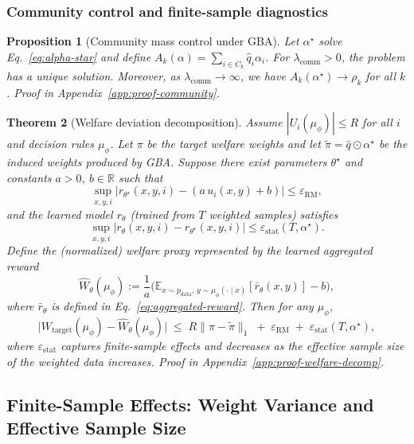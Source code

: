 \documentclass{article}
\theoremstyle{plain}
\newtheorem{theorem}{Theorem}[section]
\newtheorem{proposition}[theorem]{Proposition}
\theoremstyle{definition}
\theoremstyle{remark}
\begin{document}
\subsubsection{Community control and finite-sample diagnostics}
\begin{proposition}[Community mass control under GBA]
\label{prop:community-balance}
Let $\alpha^\star$ solve Eq.~\eqref{eq:alpha-star} and define
$A_k(\alpha)=\sum_{i\in C_k}\hat q_i\alpha_i$.
For $\lambda_{\mathrm{comm}}>0$, the problem has a unique solution. Moreover,
as $\lambda_{\mathrm{comm}}\to\infty$, we have $A_k(\alpha^\star)\to \rho_k$ for
all $k$. Proof in Appendix~\ref{app:proof-community}.
\end{proposition}

\begin{theorem}[Welfare deviation decomposition]
\label{thm:welfare-decomp}
Assume $|U_i(\mu_\phi)|\le R$ for all $i$ and decision rules $\mu_\phi$.
Let $\pi$ be the target welfare weights and let $\tilde\pi=\hat q\odot\alpha^\star$
be the induced weights produced by GBA.
Suppose there exist parameters $\theta^\star$ and constants $a>0$, $b\in\mathbb{R}$ such that
\[
\sup_{x,y,i}\big|r_{\theta^\star}(x,y,i)-(a\,u_i(x,y)+b)\big|
\le \varepsilon_{\mathrm{RM}},
\]
and the learned model $r_\theta$ (trained from $T$ weighted samples) satisfies
\[
\sup_{x,y,i}\big|r_\theta(x,y,i)-r_{\theta^\star}(x,y,i)\big|
\le \varepsilon_{\mathrm{stat}}(T,\alpha^\star).
\]
Define the (normalized) welfare proxy represented by the learned aggregated reward
\[
\widehat{W}_\theta(\mu_\phi)
:=
\frac{1}{a}\Big(\mathbb{E}_{x\sim p_{\text{data}},\,y\sim\mu_\phi(\cdot\mid x)}[\bar r_\theta(x,y)]-b\Big),
\]
where $\bar r_\theta$ is defined in Eq.~\eqref{eq:aggregated-reward}. Then for any $\mu_\phi$,
\begin{equation}
\big|W_{\mathrm{target}}(\mu_\phi)-\widehat{W}_\theta(\mu_\phi)\big|
\;\le\;
R\|\pi-\tilde\pi\|_1
\;+\;
\varepsilon_{\mathrm{RM}}
\;+\;
\varepsilon_{\mathrm{stat}}(T,\alpha^\star),
\label{eq:welfare-decomp}
\end{equation}
where $\varepsilon_{\mathrm{stat}}$ captures finite-sample effects and
decreases as the effective sample size of the weighted data increases.
Proof in Appendix~\ref{app:proof-welfare-decomp}.
\end{theorem}

\subsection{Finite-Sample Effects: Weight Variance and Effective Sample Size}
\label{subsec:theory-variance}
\end{document}
